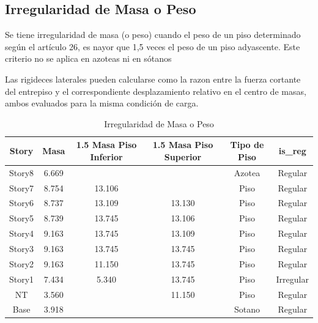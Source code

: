 \documentclass{article}%
\begin{document}
%
\subsection{Irregularidad de Masa o Peso}%
\label{subsec:IrregularidaddeMasaoPeso}%
\begin{tcolorbox}[colback=gray!5!white,colframe=cyan!75!black,fonttitle=\bfseries,title=Tabla N°9 E-030]%
Se tiene irregularidad de masa (o peso) cuando el peso de un piso determinado según el artículo 26, es nayor que 1,5 veces el peso de un piso adyascente. Este criterio no se aplica en azoteas ni en sótanos%
\end{tcolorbox}%
Las rigideces laterales pueden calcularse como la razon entre la fuerza cortante del entrepiso y el correspondiente desplazamiento relativo en el centro de masas, ambos evaluados para la misma condición de carga. \newline%
%


\begin{table}[h!]%
\centering%
\caption{Irregularidad de Masa o Peso}%
\begin{tabular}{cccccc}
\toprule
Story & Masa & 1.5 Masa Piso Inferior & 1.5 Masa Piso Superior & Tipo de Piso & is\_reg \\
\midrule
Story8 & 6.669 &  &  & Azotea & Regular \\
Story7 & 8.754 & 13.106 &  & Piso & Regular \\
Story6 & 8.737 & 13.109 & 13.130 & Piso & Regular \\
Story5 & 8.739 & 13.745 & 13.106 & Piso & Regular \\
Story4 & 9.163 & 13.745 & 13.109 & Piso & Regular \\
Story3 & 9.163 & 13.745 & 13.745 & Piso & Regular \\
Story2 & 9.163 & 11.150 & 13.745 & Piso & Regular \\
Story1 & 7.434 & 5.340 & 13.745 & Piso & Irregular \\
NT & 3.560 &  & 11.150 & Piso & Regular \\
Base & 3.918 &  &  & Sotano & Regular \\
\bottomrule
\end{tabular}
%
\end{table}

%
\newpage%
\end{document}
